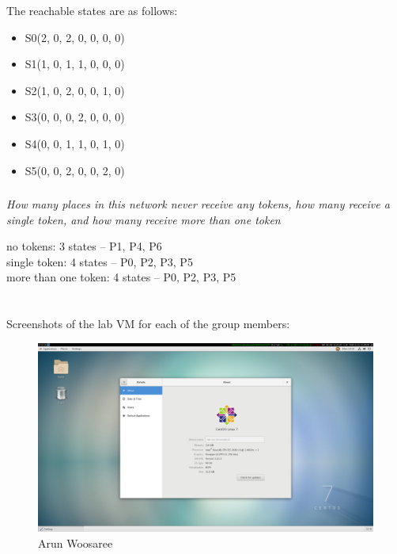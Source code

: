 \documentclass[letterpaper]{article}
\begin{document}
The reachable states are as follows:
\begin{itemize}
 \item S0(2, 0, 2, 0, 0, 0, 0)
 \item S1(1, 0, 1, 1, 0, 0, 0)
 \item S2(1, 0, 2, 0, 0, 1, 0)
 \item S3(0, 0, 0, 2, 0, 0, 0)
 \item S4(0, 0, 1, 1, 0, 1, 0)
 \item S5(0, 0, 2, 0, 0, 2, 0)
\end{itemize}

\subsubsection{}
\textit{How many places in this network never receive any tokens, how many receive a single token, and how many receive more than one token}

no tokens: 3 states -- P1, P4, P6\\
single token: 4 states -- P0, P2, P3, P5\\
more than one token: 4 states -- P0, P2, P3, P5\\


\section{}

Screenshots of the lab VM for each of the group members:

\begin{figure}[H]
 \centering
 \includegraphics[width=\textwidth]{arun.png}
 \caption{Arun Woosaree}
\end{figure}
\end{document}
